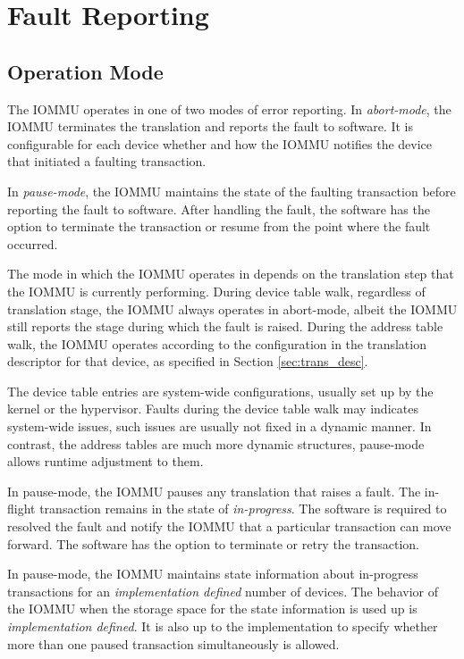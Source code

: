 \section{Fault Reporting}
\label{sec:fault}

\subsection{Operation Mode}

The IOMMU operates in one of two modes of error reporting. In \textit{abort-mode}, the
IOMMU terminates the translation and reports the fault to software. It is configurable for
each device whether and how the IOMMU notifies the device that initiated a faulting
transaction.

In \textit{pause-mode}, the IOMMU maintains the state of the faulting transaction before
reporting the fault to software. After handling the fault, the software has the option to
terminate the transaction or resume from the point where the fault occurred.

The mode in which the IOMMU operates in depends on the translation step that the IOMMU is
currently performing. During device table walk, regardless of translation stage, the IOMMU
always operates in abort-mode, albeit the IOMMU still reports the stage during which the
fault is raised. During the address table walk, the IOMMU operates
according to the configuration in the translation descriptor for that device, as specified
in Section \ref{sec:trans_desc}.

\note The device table entries are system-wide configurations, usually set up by the
kernel or the hypervisor. Faults during the device table walk may indicates system-wide
issues, such issues are usually not fixed in a dynamic manner. In contrast, the address
tables are much more dynamic structures, pause-mode allows runtime adjustment to them.
\noteend

In pause-mode, the IOMMU pauses any translation that raises a fault. The in-flight
transaction remains in the state of \textit{in-progress}. The software is required to
resolved the fault and notify the IOMMU that a particular transaction can move forward.
The software has the option to terminate or retry the transaction.

In pause-mode, the IOMMU maintains state information about in-progress transactions for an
\textit{implementation defined} number of devices.  The behavior of the IOMMU when the
storage space for the state information is used up is \textit{implementation defined}. It
is also up to the implementation to specify whether more than one paused transaction
simultaneously is allowed.

